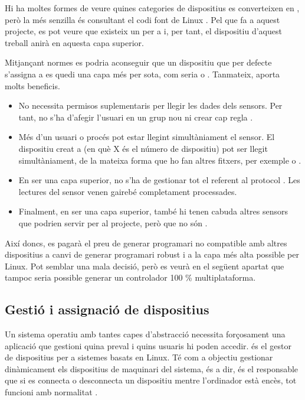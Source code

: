Hi ha moltes formes de veure quines categories de dispositius  es
converteixen en , però la més senzilla és consultant el codi
font de Linux \cite{KernelIioAccel}. Pel que fa a aquest projecte, es pot veure
que existeix un  per a  i, per tant, el
dispositiu d'aquest treball anirà en aquesta capa superior.

Mitjançant normes  es podria aconseguir que un dispositiu que per 
defecte s'assigna a  es quedi una capa més per sota, com seria
 o . Tanmateix,  aporta molts beneficis.

\begin{itemize}
    \item No necessita permisos suplementaris per llegir les dades dels
    sensors. Per tant, no s'ha d'afegir l'usuari en un grup nou ni crear
    cap regla .
    \item Més d'un usuari o procés pot estar llegint simultàniament el sensor.
    El dispositiu creat a  (en què X és el número de
    dispositiu) pot ser llegit simultàniament, de la mateixa forma que ho fan
    altres fitxers, per exemple  o .
    \item En ser una capa superior, no s'ha de gestionar tot el referent al
    protocol . Les lectures del sensor venen gairebé completament
    processades.
    \item Finalment, en ser una capa superior, també hi tenen cabuda altres
    sensors que podrien servir per al projecte, però que no són .
\end{itemize}

Així doncs, es pagarà el preu de generar programari no compatible amb altres
dispositius a canvi de generar programari robust i a la capa més alta possible
per Linux. Pot semblar una mala decisió, però es veurà en el següent apartat
que tampoc seria possible generar un controlador 100 \% multiplataforma.

\subsection{Gestió i assignació de dispositius}

Un sistema operatiu amb tantes capes d'abstracció necessita forçosament una
aplicació que gestioni quina preval i quins usuaris hi poden accedir.
 és el gestor de dispositius per a sistemes basats en Linux.
Té com a objectiu gestionar dinàmicament els dispositius de maquinari del
sistema, és a dir, és el responsable que si es connecta o desconnecta
un dispositiu mentre l'ordinador està encès, tot funcioni amb normalitat \cite{Udev}.

